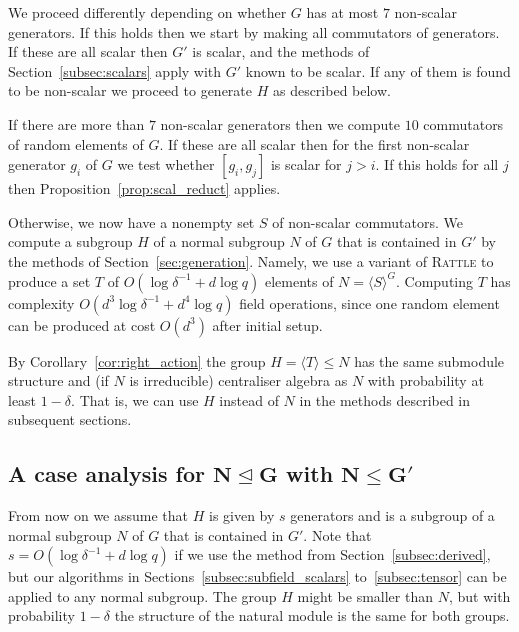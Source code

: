 
We proceed differently depending on whether $G$ has at most $7$ 
non-scalar generators. If this holds then we start by making all 
commutators of generators. If these are all scalar then $G'$ is 
scalar, and the methods of Section~\ref{subsec:scalars} apply with $G'$ known to be scalar. If any of them is found to be non-scalar we proceed to generate $H$ as described below.

If there are more than $7$ non-scalar generators then we compute $10$
commutators of random elements of $G$. If these are all scalar 
then for the first non-scalar generator $g_i$ of $G$ we test 
whether $[g_i, g_j]$ is scalar for $j > i$. If this holds for 
all $j$ then Proposition~\ref{prop:scal_reduct} applies. 

Otherwise, we now have a nonempty set $S$ of non-scalar commutators. We 
compute a subgroup $H$ of a normal subgroup $N$ of $G$ 
that is contained in $G'$ by 
 the methods of Section~\ref{sec:generation}. 
Namely,  we use a variant of \textsc{Rattle} \cite{LGMurray, LGO97} to 
%
produce a set $T$ of $O(\log \delta^{-1} + d \log q)$ elements of 
$N = \langle S \rangle^G$. Computing $T$ has complexity 
$O(d^3 \log \delta^{-1} + d^4 \log q)$ 
field operations, since one random element can be produced
at cost $O(d^3)$ after initial setup.

By Corollary~\ref{cor:right_action} 
the group $H = \langle T \rangle \leq N$  has the 
same submodule structure and (if $N$ is irreducible) centraliser algebra 
as $N$ with probability at least $1 -
\delta$. That is, we can use $H$ instead of
$N$ in the methods described in subsequent sections.


\subsection{A case analysis for $\mathbf{N \unlhd G}$ with
$\mathbf{N \leq G'}$}
\label{subsec:caseanalysis}

{} From now on we assume that $H$ is given by $s$ generators 
and is a subgroup of a normal subgroup $N$ of $G$ that is
contained in $G'$.  Note that
$s = O(\log \delta^{-1} + d \log q)$ if we use the method from
Section~\ref{subsec:derived}, but our algorithms in 
Sections~\ref{subsec:subfield_scalars} to~\ref{subsec:tensor} can be applied 
to any normal subgroup. The group $H$ might be smaller than $N$, but with 
probability $1-\delta$ the structure of the natural module is the same for both
groups. 


